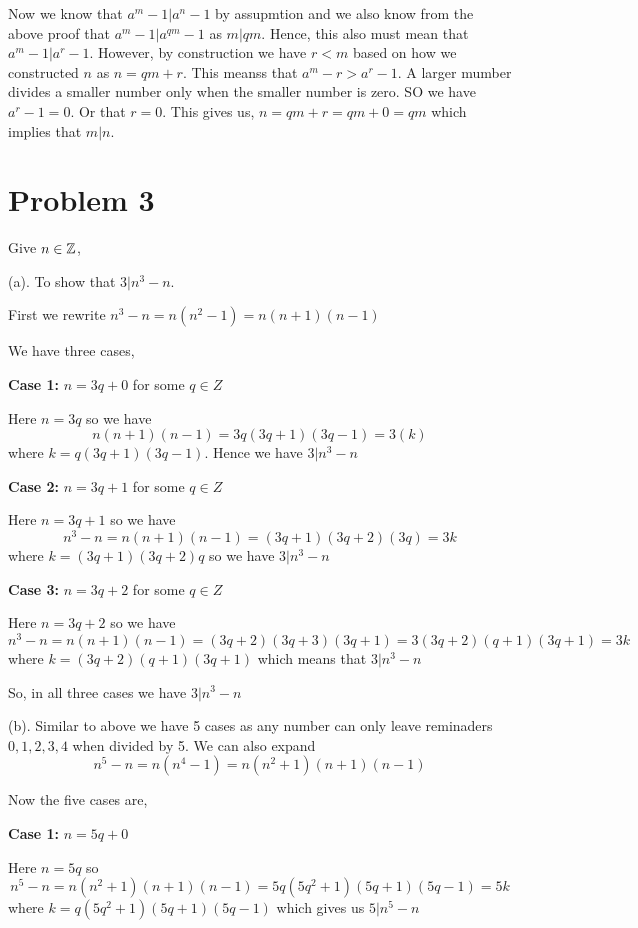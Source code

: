 \documentclass[a4paper]{report}
\begin{document}
Now we know that $a^{m} - 1 | a^{n} - 1$ by assupmtion and we also know from the above proof that $a^{m} - 1 | a^{qm} - 1$ as $m | qm$. Hence, this also must mean that  $a^{m} - 1  | a^{r} - 1$. However, by construction we have $r < m$ based on how we constructed  $n$ as $n = qm + r$. This meanss that $a^{m} - r > a^{r} - 1$. A larger mumber divides a smaller number only when the smaller number is zero. SO we have $a^{r} - 1 = 0$. Or that $r = 0$. This gives us,  $n = qm + r = qm + 0 = qm$ which implies that  $m | n$.
\



\section*{Problem 3}
Give $n \in \mathbb{Z}$,


(a). To show that $3 | n^{3} - n$.

First we rewrite $n^{3} - n = n(n^2 - 1) = n(n + 1)(n - 1)$

We have three cases, 

\textbf{Case 1:} $n = 3q + 0$ for some  $q \in Z$

 Here $n  = 3q$ so we have  $$n(n + 1)(n - 1) = 3q(3q + 1)(3q - 1) = 3(k)$$  where $k = q(3q + 1)(3q - 1) $. Hence we have $3 | n^{3} - n$

\textbf{Case 2:} $n = 3q + 1$ for some  $q \in Z$

 Here $n = 3q + 1$ so we have  $$n^{3} -n = n(n + 1)(n - 1) = (3q + 1 )(3q + 2)(3q) = 3k$$ where $k = (3q + 1 )(3q + 2)q$ so we have $3 | n^{3} - n$

\textbf{Case 3:} $n = 3q + 2$ for some  $q \in Z$

 Here $n = 3q + 2$ so we have  $$n^{3} - n = n (n + 1)(n - 1) = (3q + 2)(3q + 3)(3q + 1) = 3 (3q + 2)(q + 1)(3q + 1) = 3k$$ where $k =(3q + 2)(q + 1)(3q + 1)  $ which means that $3 | n^{3} - n$

So, in all three cases we have $3 | n^{3} - n$

(b). Similar to above we have 5 cases as any number can only leave reminaders $0, 1, 2, 3, 4$ when divided by 5. We can also expand $$n^{5} - n = n(n^{4} - 1) = n(n^2 + 1)(n + 1)(n - 1)$$


Now the five cases are,


\textbf{Case 1:}  $n = 5q + 0$

 Here $n = 5q$ so  $$n^{5} - n = n(n^2 + 1)(n + 1)(n - 1) = 5q(5q^2 + 1)(5q + 1)(5q - 1) = 5k$$ where $k = q(5q^2 + 1)(5q + 1)(5q - 1)$ which gives us $5 | n^{5} - n$
\end{document}
